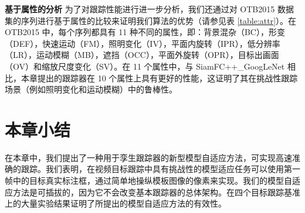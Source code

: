 \begin{table}[t]
\centering
\caption{OTB2015 在 11 种属性下对成功率进行比较。}
\label{table:attr}
\end{table}

\textbf{基于属性的分析} 为了对跟踪性能进行进一步分析，我们还通过对 OTB2015 数据集的序列进行基于属性的比较来证明我们算法的优势（请参见表 \ref{table:attr}）。在 OTB2015 中，每个序列都具有 11 种不同的属性，即：背景混杂（BC），形变（DEF），快速运动（FM），照明变化（IV），平面内旋转（IPR），低分辨率（LR），运动模糊（MB），遮挡（OCC），平面外旋转（OPR），目标出画面（OV）和缩放尺度变化（SV）。在 11 个属性中，与 SiamFC++\_GoogLeNet \cite{SiamFC++} 相比，本章提出的跟踪器在 10 个属性上具有更好的性能，这证明了其在挑战性跟踪场景（例如照明变化和运动模糊）中的鲁棒性。

\section{本章小结}
在本章中，我们提出了一种用于孪生跟踪器的新型模型自适应方法，可实现高速准确的跟踪。我们表明，在视频目标跟踪中具有挑战性的模型适应任务可以使用第一帧中的目标真实标注框，通过简单地操纵模板图像的像素来实现。我们的模型自适应方法是可插拔的，因为它不会改变基本跟踪器的总体架构。在四个目标跟踪基准上的大量实验结果证明了所提出的模型自适应方法的有效性。